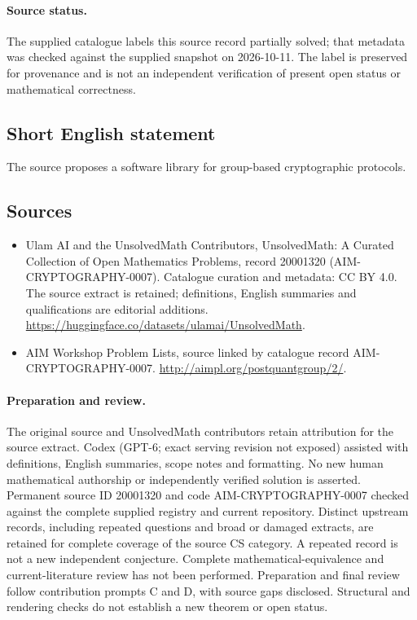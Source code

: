 \documentclass[11pt]{article}
\begin{document}
\paragraph{Source status.}
The supplied catalogue labels this source record partially solved; that metadata was checked against the supplied snapshot on 2026-10-11. The label is preserved for provenance and is not an independent verification of present open status or mathematical correctness.
\subsection{Short English statement}
The source proposes a software library for group-based cryptographic protocols.
\subsection{Sources}
\begin{itemize}
\item[\hypertarget{source:20001320:1}{S1}] Ulam AI and the UnsolvedMath Contributors, UnsolvedMath: A Curated Collection of Open Mathematics Problems, record 20001320 (AIM-CRYPTOGRAPHY-0007). Catalogue curation and metadata: CC BY 4.0. The source extract is retained; definitions, English summaries and qualifications are editorial additions.
\url{https://huggingface.co/datasets/ulamai/UnsolvedMath}.
\item[\hypertarget{source:20001320:2}{S2}] AIM Workshop Problem Lists, source linked by catalogue record AIM-CRYPTOGRAPHY-0007.
\url{http://aimpl.org/postquantgroup/2/}.
\end{itemize}
\paragraph{Preparation and review.}
The original source and UnsolvedMath contributors retain attribution for the source extract. Codex (GPT-6; exact serving revision not exposed) assisted with definitions, English summaries, scope notes and formatting. No new human mathematical authorship or independently verified solution is asserted. Permanent source ID 20001320 and code AIM-CRYPTOGRAPHY-0007 checked against the complete supplied registry and current repository. Distinct upstream records, including repeated questions and broad or damaged extracts, are retained for complete coverage of the source CS category. A repeated record is not a new independent conjecture. Complete mathematical-equivalence and current-literature review has not been performed. Preparation and final review follow contribution prompts C and D, with source gaps disclosed. Structural and rendering checks do not establish a new theorem or open status.
\label{end:20001320}
\end{document}
